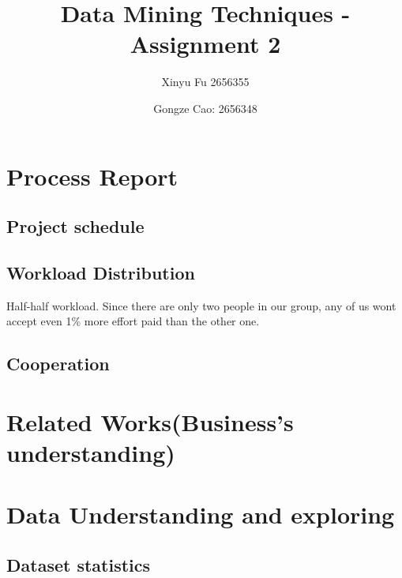 \documentclass[runningheads]{llncs}
\begin{document}
%
\title{Data Mining Techniques - Assignment 2}
%
%
\author{Xinyu Fu 2656355 \and
Gongze Cao: 2656348 }
%
%
%
\maketitle              %
%

%
%
%
%
\section{Process Report}
    \subsection{Project schedule}

    \subsection{Workload Distribution}
    Half-half workload. Since there are only two people in our group, any of us wont accept even 1\% more effort paid than the other one.
    \subsection{Cooperation}

\section{Related Works(Business's understanding)}

\section{Data Understanding and exploring}
    \subsection{Dataset statistics}
    
\end{document}
